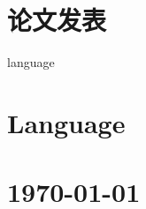\documentclass{article}
\begin{document}


\section*{论文发表}










language
\section*{Language}
\indent




\vfill

\section*{\hfill\color{OliveGreen}\today}
\end{document}
